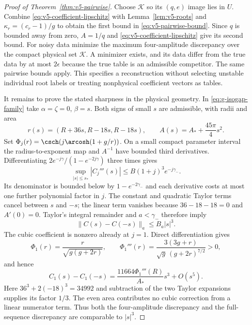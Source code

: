 \begin{proof}[Proof of Theorem~\ref{thm:v5-pairwise}]
Choose $\mathcal K$ so its $(q,e)$ image lies in $U$. Combine
\eqref{eq:v5-coefficient-lipschitz} with Lemma~\ref{lem:v5-roots}
and $\kappa_r=(c_r-1)/g$ to obtain the first bound in
\eqref{eq:v5-pairwise-bound}. Since $q$ is bounded away from zero,
$A=1/q$ and \eqref{eq:v5-coefficient-lipschitz} give its second bound.
For noisy data minimize the maximum four-amplitude discrepancy over
the compact physical set $\mathcal K$. A minimizer exists, and its
data differ from the true data by at most $2\epsilon$ because the true
table is an admissible competitor. The same pairwise bounds apply.
This specifies a reconstruction without selecting unstable individual
root labels or treating nonphysical coefficient vectors as tables.

It remains to prove the stated sharpness in the physical geometry.
In \eqref{eq:g-isogap-family} take $\alpha=\zeta=0$, $\beta=s$.
Both signs of small $s$ are admissible, with radii and area
\[
 r(s)=(R+36s,R-18s,R-18s),\qquad
 A(s)=A_*+\frac{45\pi}{4}s^2.
\]
Set $\Phi_j(r)=\csch(j\arcosh(1+g/r))$. On a small compact parameter
interval the radius-to-exponent map and $A^{-1}$ have bounded
third derivatives. Differentiating
$2e^{-j\gamma}/(1-e^{-2j\gamma})$ three times gives
\begin{equation}\label{eq:v5-third-sequence}
 \sup_{|s|\le s_*}|C_j'''(s)|\le B(1+j)^3e^{-j\gamma_-}.
\end{equation}
Its denominator is bounded below by $1-e^{-2\gamma_-}$ and each
derivative costs at most one further polynomial factor in $j$.
The constant and quadratic Taylor terms cancel between $s$ and $-s$;
the linear term vanishes because $36-18-18=0$ and $A'(0)=0$.
Taylor's integral remainder and $a<\gamma_-$ therefore imply
\begin{equation}\label{eq:v5-cubic-sequence}
 \|C(s)-C(-s)\|_a\le B_a|s|^3.
\end{equation}
The cubic coefficient is nonzero already at $j=1$. Direct
 differentiation gives
\[
 \Phi_1(r)=\frac{r}{\sqrt{g(g+2r)}},\qquad
 \Phi_1'''(r)=\frac{3(3g+r)}{\sqrt g\,(g+2r)^{7/2}}>0,
\]
and hence
\begin{equation}\label{eq:v5-cubic-coefficient}
 C_1(s)-C_1(-s)=\frac{11664\Phi_1'''(R)}{A_*}s^3+O(s^5).
\end{equation}
Here $36^3+2(-18)^3=34992$ and subtraction of the two Taylor
expansions supplies its factor $1/3$. The even area contributes no
cubic correction from a linear numerator term. Thus both the
four-amplitude discrepancy and the full-sequence discrepancy are
comparable to $|s|^3$.


\end{proof}
